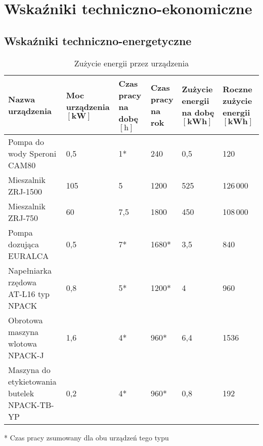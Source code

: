 \section{Wskaźniki techniczno-ekonomiczne}

\subsection{Wskaźniki techniczno-energetyczne}

\begin{table}[h]
	\centering
	\caption{Zużycie energii przez urządzenia}
	\begin{tabular}{*{6}{l}}
		\hline
		\makecell[l]{\textbf{Nazwa} \\ \textbf{urządzenia}} & \makecell[l]{\textbf{Moc urządzenia} \\ $[\mathrm{\mathbf{kW}}]$} & \makecell[l]{\textbf{Czas pracy} \\ \textbf{na dobę} $[\mathbf{\mathrm{h}}]$} & \makecell[l]{\textbf{Czas pracy} \\ \textbf{na rok}} & \makecell[l]{\textbf{Zużycie energii} \\ \textbf{na dobę} $[\mathrm{\mathbf{kWh}}]$} & \makecell[l]{\textbf{Roczne zużycie} \\ \textbf{energii} $[\mathrm{\mathbf{kWh}}]$} \\
		\hline\hline
		Pompa do wody \textsf{Speroni CAM80} & 0,5 & 1* & 240 & 0,5 & 120 \\
		Mieszalnik \textsf{ZRJ-1500} & 105 & 5 & 1200 & 525 & 126\,000 \\
		Mieszalnik \textsf{ZRJ-750} & 60 & 7,5 & 1800 & 450 & 108\,000 \\
		Pompa dozująca \textsf{EURALCA} & 0,5 & 7* & 1680* & 3,5 & 840 \\
		\makecell[l]{Napełniarka rzędowa \\ \textsf{AT-L16 typ NPACK}} & 0,8 & 5* & 1200* & 4 & 960 \\
		\makecell[l]{Obrotowa maszyna wlotowa \\ \textsf{NPACK-J}} & 1,6 & 4* & 960* & 6,4 & 1536 \\
		\makecell[l]{Maszyna do \\ etykietowania butelek \textsf{NPACK-TB-YP}} & 0,2 & 4* & 960* & 0,8 & 192 \\
		\hline
	\end{tabular}
\end{table}

* Czas pracy zsumowany dla obu urządzeń tego typu


